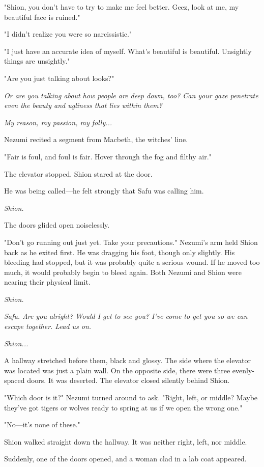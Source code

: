 "Shion, you don't have to try to make me feel better. Geez, look at me,
my beautiful face is ruined."

"I didn't realize you were so narcissistic."

"I just have an accurate idea of myself. What's beautiful is beautiful.
Unsightly things are unsightly."

"Are you just talking about looks?"

\emph{Or are you talking about how people are deep down, too? Can your gaze
penetrate even the beauty and ugliness that lies within them?}

\emph{My reason, my passion, my folly...}

Nezumi recited a segment from Macbeth, the witches' line.

"Fair is foul, and foul is fair. Hover through the fog and filthy air."

The elevator stopped. Shion stared at the door.

He was being called---he felt strongly that Safu was calling him.

\emph{Shion.}

The doors glided open noiselessly.

"Don't go running out just yet. Take your precautions." Nezumi's arm
held Shion back as he exited first. He was dragging his foot, though
only slightly. His bleeding had stopped, but it was probably quite a
serious wound. If he moved too much, it would probably begin to bleed
again. Both Nezumi and Shion were nearing their physical limit.

\emph{Shion.}

\emph{Safu. Are you alright? Would I get to see you? I've come to get you so
we can escape together. Lead us on.}

\emph{Shion...}

A hallway stretched before them, black and glossy. The side where the
elevator was located was just a plain wall. On the opposite side, there
were three evenly-spaced doors. It was deserted. The elevator closed
silently behind Shion.

"Which door is it?" Nezumi turned around to ask. "Right, left, or
middle? Maybe they've got tigers or wolves ready to spring at us if we
open the wrong one."

"No---it's none of these."

Shion walked straight down the hallway. It was neither right, left, nor
middle.

Suddenly, one of the doors opened, and a woman clad in a lab coat
appeared.

